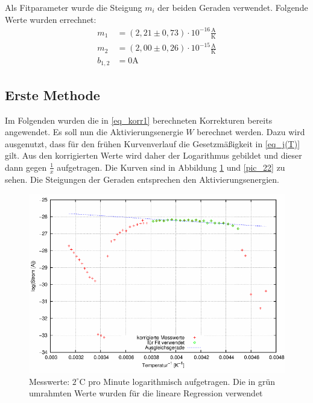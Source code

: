 Als Fitparameter wurde die Steigung $m_i$ der beiden Geraden verwendet. Folgende Werte wurden errechnet:\\
\begin{align}
m_1&=(2,21     \pm 0,73) \cdot10^{-16} \frac{\text{A}}{\text{K}}\\
\label{eq_korr1}
m_2&=( 2,00  \pm0,26)\cdot10^{-15}\frac{\text{A}}{\text{K}}\\
b_{1,2}&=0 \text{A}
\end{align}

\subsection{Erste Methode}
Im Folgenden wurden die in \eqref{eq_korr1} berechneten Korrekturen bereits angewendet. Es soll nun die Aktivierungsenergie $W$ berechnet werden. Dazu wird ausgenutzt, dass für den frühen Kurvenverlauf die Gesetzmäßigkeit in \eqref{eq_j(T)} gilt. Aus den korrigierten Werte wird daher der Logarithmus gebildet und dieser dann gegen $\frac{1}{x}$ aufgetragen. Die Kurven sind in Abbildung \ref{pic_21} und \ref{pic_22} zu sehen. Die Steigungen der Geraden entsprechen den Aktivierungsenergien.\\

\begin{figure}[H]
\includegraphics[scale=0.8]{../gnu/relax21.pdf}
\caption{Messwerte: $2^\circ$C pro Minute logarithmisch aufgetragen. Die in grün umrahmten Werte wurden für die lineare Regression verwendet}
\label{pic_21}
\end{figure}

